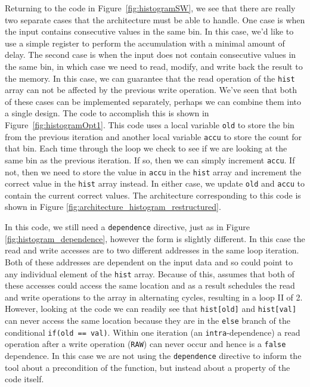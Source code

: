 Returning to the code in Figure~\ref{fig:histogramSW}, we see that there are really two separate cases that the architecture must be able to handle.  One case is when the input contains consecutive values in the same bin.  In this case, we'd like to use a simple register to perform the accumulation with a minimal amount of delay.  The second case is when the input does not contain consecutive values in the same bin, in which case we need to read, modify, and write back the result to the memory.  In this case, we can guarantee that the read operation of the \lstinline|hist| array can not be affected by the previous write operation.   We've seen that both of these cases can be implemented separately, perhaps we can combine them into a single design.  The code to accomplish this is shown in Figure~\ref{fig:histogramOpt1}. This code uses a local variable \lstinline|old| to store the bin from the previous iteration and another local variable \lstinline{accu} to store the count for that bin.  Each time through the loop we check to see if we are looking at the same bin as the previous iteration.  If so, then we can simply increment \lstinline|accu|.  If not, then we need to store the value in \lstinline|accu| in the \lstinline|hist| array and increment the correct value in the \lstinline|hist| array instead.  In either case, we update \lstinline|old| and \lstinline|accu| to contain the current correct values.  The architecture corresponding to this code is shown in Figure \ref{fig:architecture_histogram_restructured}.  

In this code, we still need a \lstinline|dependence| directive, just as in Figure \ref{fig:histogram_dependence}, however the form is slightly different.  In this case the read and write accesses are to two different addresses in the same loop iteration.  Both of these addresses are dependent on the input data and so could point to any individual element of the \lstinline|hist| array.  Because of this, \VHLS assumes that both of these accesses could access the same location and as a result schedules the read and write operations to the array in alternating cycles, resulting in a loop II of 2.  However, looking at the code we can readily see that \lstinline|hist[old]| and \lstinline|hist[val]| can never access the same location because they are in the \lstinline|else| branch of the conditional \lstinline|if(old == val)|.  Within one iteration (an \lstinline|intra|-dependence) a read operation after a write operation (\lstinline|RAW|) can never occur and hence is a \lstinline|false| dependence.  In this case we are not using the \lstinline|dependence| directive to inform the tool about a precondition of the function, but instead about a property of the code itself. 

